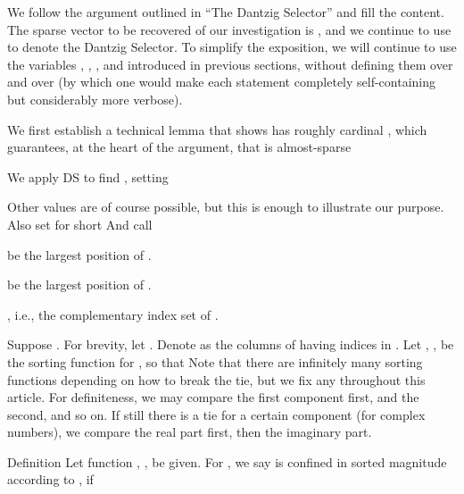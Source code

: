 \startchapter [title={Theorems and Proofs}]

We follow the argument outlined in ``The Dantzig Selector'' and fill the content.
The sparse vector to be recovered of our investigation is , and we continue to use  to denote the Dantzig Selector.
To simplify the exposition, we will continue to use the variables , , , and  introduced in previous sections, without defining them over and over (by which one would make each statement completely self-containing but considerably more verbose).

We first establish a technical lemma that shows  has roughly cardinal , which guarantees, at the heart of the argument, that  is almost-sparse 


\startsection [title={Almost-Sparsity of Beamspace Channel Matrix}]

We apply DS to find , setting

Other values are of course possible, but this is enough to illustrate our purpose.
Also set for short
%
%
And call
\startitemize
\item {} be the largest  position of .
\item {} be the largest  position of .
\item {}, i.e., the complementary index set of .
\stopitemize


Suppose .
For brevity, let .
Denote as  the columns of  having indices in .
Let , , be the sorting function for , so that
Note that there are infinitely many sorting functions depending on how to break the tie, but we fix any  throughout this article.
For definiteness, we may compare the first component first, and the second, and so on.
If still there is a tie for a certain component (for complex numbers), we compare the real part first, then the imaginary part.

\Result
{Definition}
{
Let function , , be given.
For , we say  is confined in sorted magnitude according to , if
}

